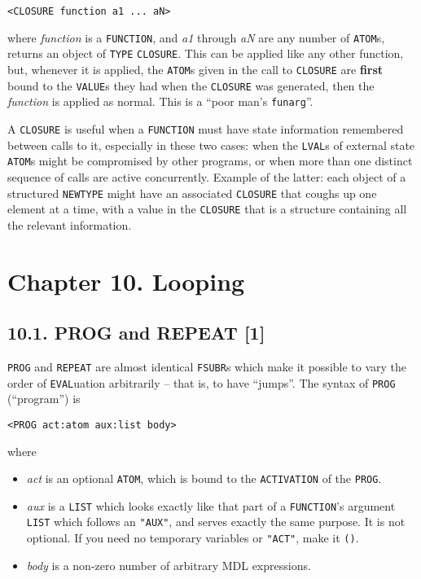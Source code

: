 \documentclass[a4paper,]{article}
\providecommand{\tightlist}{%
  \setlength{\itemsep}{0pt}\setlength{\parskip}{0pt}}
\begin{document}
\begin{verbatim}
<CLOSURE function a1 ... aN>
\end{verbatim}

 where \emph{function} is a \texttt{FUNCTION}, and \emph{a1} through \emph{aN} are any
number of \texttt{ATOM}s, returns an object of \texttt{TYPE} \texttt{CLOSURE}. This can be applied like any other function,
but, whenever it is applied, the \texttt{ATOM}s given in the call to \texttt{CLOSURE} are \textbf{first} bound to the
\texttt{VALUE}s they had when the \texttt{CLOSURE} was generated, then the \emph{function} is applied as normal. This is a
``poor man's \texttt{funarg}''.

A \texttt{CLOSURE} is useful when a \texttt{FUNCTION} must have state information remembered between calls to it,
especially in these two cases: when the \texttt{LVAL}s of external state \texttt{ATOM}s might be compromised by other
programs, or when more than one distinct sequence of calls are active concurrently. Example of the latter: each object of a
structured \texttt{NEWTYPE} might have an associated \texttt{CLOSURE} that coughs up one element at a time, with a value in
the \texttt{CLOSURE} that is a structure containing all the relevant information.

\section{Chapter 10. Looping}\label{chapter-10.-looping}

\subsection{10.1. PROG and REPEAT {[}1{]}}\label{prog-and-repeat-1}

\texttt{PROG}  and \texttt{REPEAT}  are almost identical
\texttt{FSUBR}s  which make it possible to vary the order of \texttt{EVAL}uation arbitrarily -- that
is, to have ``jumps''. The syntax of \texttt{PROG} (``program'') is

\begin{verbatim}
<PROG act:atom aux:list body>
\end{verbatim}

where

\begin{itemize}
\tightlist
\item
  \emph{act} is an optional \texttt{ATOM}, which is bound to the \texttt{ACTIVATION} of the \texttt{PROG}.
\item
  \emph{aux} is a \texttt{LIST} which looks exactly like that part of a \texttt{FUNCTION}'s argument \texttt{LIST} which
  follows an \texttt{"AUX"}, and serves exactly the same purpose. It is not optional. If you need no temporary variables or
  \texttt{"ACT"}, make it \texttt{()}.
\item
  \emph{body} is a non-zero number of arbitrary MDL expressions.
\end{itemize}
\end{document}
